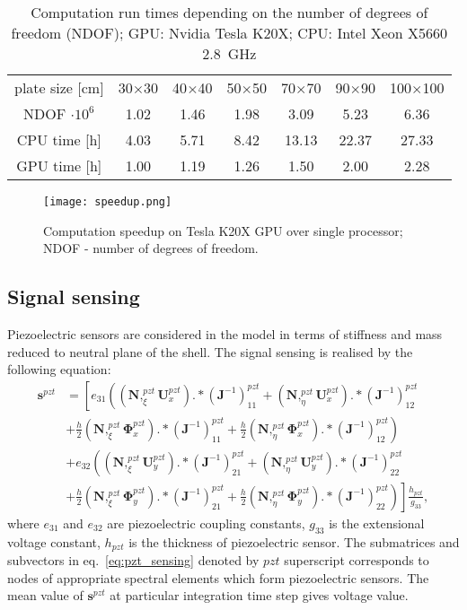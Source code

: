 \documentclass[preprint,12pt]{elsarticle}
\renewcommand{\vec}[1]{\mathbf{#1}}
\renewcommand{\bm}[1]{\mathbf{#1}}
\newcommand{\bs}[1]{\boldsymbol{#1}}
\begin{document}
	\begin{table}
		\renewcommand{\arraystretch}{1.3}
		\centering \footnotesize
		\caption{Computation run times depending on the number of degrees of freedom (NDOF); GPU: Nvidia Tesla K20X; CPU: Intel Xeon X5660 2.8~GHz}
		\begin{tabular}{ccccccc} 
			\toprule	
			plate size [cm] & 30$\times$30  & 40$\times$40 & 50$\times$50 & 70$\times$70 & 90$\times$90 & 100$\times$100 \\
			NDOF $\cdot 10^6$ & 1.02  & 1.46 & 1.98 & 3.09 & 5.23 & 6.36 \\
			\midrule
			CPU time [h]& 4.03& 5.71 & 8.42 & 13.13 & 22.37 & 27.33\\
			\midrule
			GPU time [h]& 1.00& 1.19 & 1.26 & 1.50 & 2.00 & 2.28\\
			\bottomrule 
		\end{tabular} 
		\label{tab:run_time}
	\end{table}

	\begin{figure} [h!]
		\centering
		\texttt{[image: speedup.png]}	
		\caption{Computation speedup on Tesla K20X GPU over single processor; NDOF - number of degrees of freedom.}
		\label{fig:speedup}
	\end{figure}

\newpage
	\subsection{Signal sensing}
	Piezoelectric sensors are considered in the model in terms of stiffness and mass reduced to neutral plane of the shell. The signal sensing is realised by the following equation:
	\begin{equation}
	\begin{split}
	\vec{s}^{pzt} &= \left[ e_{31}\left((\bm{N},_{\xi}^{pzt}\vec{U}_x^{pzt}).*(\vec{J}^{-1})_{11}^{pzt} + (\bm{N},_{\eta}^{pzt}\vec{U}_x^{pzt}).*(\vec{J}^{-1})_{12}^{pzt} \right.\right.\\
	&+ \frac{h}{2} (\bm{N},_{\xi}^{pzt}\bs{\Phi}_x^{pzt}).*(\vec{J}^{-1})_{11}^{pzt} + \frac{h}{2} \left.(\bm{N},_{\eta}^{pzt}\bs{\Phi}_x^{pzt}).*(\vec{J}^{-1})_{12}^{pzt}\right)\\
	&+ e_{32}\left((\bm{N},_{\xi}^{pzt}\vec{U}_y^{pzt}).*(\vec{J}^{-1})_{21}^{pzt} + (\bm{N},_{\eta}^{pzt}\vec{U}_y^{pzt}).*(\vec{J}^{-1})_{22}^{pzt} \right.\\
	&+ \frac{h}{2} (\bm{N},_{\xi}^{pzt}\bs{\Phi}_y^{pzt}).*(\vec{J}^{-1})_{21}^{pzt} + \frac{h}{2} \left.\left.(\bm{N},_{\eta}^{pzt}\bs{\Phi}_y^{pzt}).*(\vec{J}^{-1})_{22}^{pzt}\right)\right] \frac{h_{pzt}}{g_{33}}, 
	\end{split}
	\label{eq:pzt_sensing}
	\end{equation}
	where $e_{31}$ and $e_{32}$ are piezoelectric coupling constants, $g_{33}$ is the extensional voltage constant, $h_{pzt}$ is the thickness of piezoelectric sensor. The submatrices and subvectors in eq.~\ref{eq:pzt_sensing} denoted by $pzt$ superscript corresponds to nodes of appropriate spectral elements which form piezoelectric sensors. The mean value of $\vec{s}^{pzt}$ at particular integration time step gives voltage value. 
\end{document}
